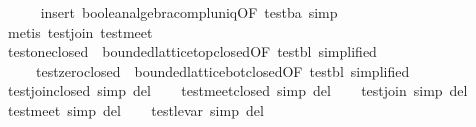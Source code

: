 \begin{isabellebody}
%
\isadelimproof
\ \ \ \ %
\endisadelimproof
%
\isatagproof
{}\isamarkupfalse%
\ {}insert\ boolean{}algebra{}compl{}uniq{}OF\ test{}ba{}{}\ simp{}\isanewline
\ \ \ \ \isamarkupfalse%
\ {}metis\ test{}join\ test{}meet{}%
\endisatagproof
{\isafoldproof}%
%
\isadelimproof
\isanewline
%
\endisadelimproof
\isanewline
\ \ \isamarkupfalse%
\ test{}one{}closed\ {}\ bounded{}lattice{}top{}closed{}OF\ test{}bl{}\ simplified{}\isanewline
\ \ \ \ \ test{}zero{}closed\ {}\ bounded{}lattice{}bot{}closed{}OF\ test{}bl{}\ simplified{}\isanewline
\isanewline
\ \ \isamarkupfalse%
\ test{}join{}closed\ {}simp\ del{}\isanewline
\ \ \isamarkupfalse%
\ test{}meet{}closed\ {}simp\ del{}\isanewline
\ \ \isamarkupfalse%
\ test{}join\ {}simp\ del{}\isanewline
\ \ \isamarkupfalse%
\ test{}meet\ {}simp\ del{}\isanewline
\ \ \isamarkupfalse%
\ test{}le{}var\ {}simp\ del{}\isanewline

\end{isabellebody}
